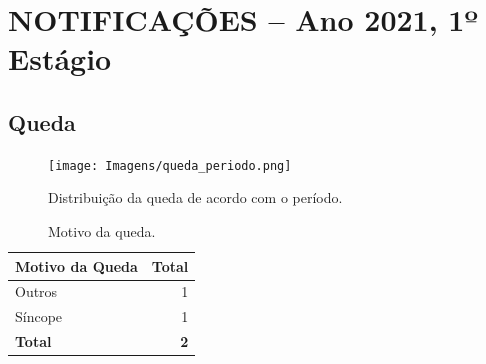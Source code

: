 \documentclass[
  a4paper]{article}
\author{}
\date{\vspace{-2.5em}}
\begin{document}

\section{NOTIFICAÇÕES – Ano 2021, 1º Estágio}

\subsection{Queda}

\begin{table}[H]

\caption{\label{tab:unnamed-chunk-3}Distribuição das quedas mês a mês de acordo com o dano.}
\centering
{}
\end{table}

\begin{figure}[H]
\caption{Distribuição da queda de acordo com o período.}
\texttt{[image: Imagens/queda\_periodo.png]}
\end{figure}

\begin{table}[H]

\caption{\label{tab:unnamed-chunk-5}Motivo da queda.}
\centering
\begin{tabular}[t]{lr}
\toprule
Motivo da Queda & Total\\
\midrule
Outros & 1\\
Síncope & 1\\
\midrule
\textbf{Total} & \textbf{2}\\
\bottomrule
\end{tabular}
\end{table}
\end{document}
